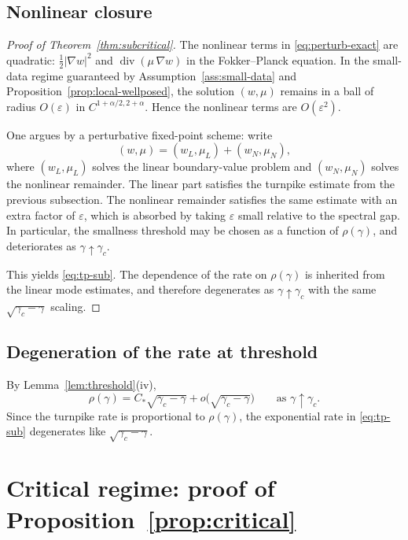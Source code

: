 \documentclass[11pt]{amsart}
\theoremstyle{definition}
\theoremstyle{remark}
\newcommand{\gamc}{\gamma_c}
\newcommand{\Div}{\operatorname{div}}
\newcommand{\grad}{\nabla}
\newcommand{\eps}{\varepsilon}
\begin{document}
\subsection{Nonlinear closure}
\label{sub:nonlinear}

\begin{proof}[Proof of Theorem~\ref{thm:subcritical}]
The nonlinear terms in \eqref{eq:perturb-exact} are quadratic:
$\frac12|\grad w|^2$ and $\Div(\mu\,\grad w)$ in the Fokker--Planck equation. In the small-data regime guaranteed by Assumption~\ref{ass:small-data} and Proposition~\ref{prop:local-wellposed}, the solution $(w,\mu)$ remains in a ball of radius $O(\eps)$ in $C^{1+\alpha/2,2+\alpha}$. Hence the nonlinear terms are $O(\eps^2)$.

One argues by a perturbative fixed-point scheme: write
\[
(w,\mu)=(w_L,\mu_L)+(w_N,\mu_N),
\]
where $(w_L,\mu_L)$ solves the linear boundary-value problem and $(w_N,\mu_N)$ solves the nonlinear remainder. The linear part satisfies the turnpike estimate from the previous subsection. The nonlinear remainder satisfies the same estimate with an extra factor of $\eps$, which is absorbed by taking $\eps$ small relative to the spectral gap. In particular, the smallness threshold may be chosen as a function of $\rho(\gamma)$, and deteriorates as $\gamma\uparrow\gamc$.

This yields \eqref{eq:tp-sub}. The dependence of the rate on $\rho(\gamma)$ is inherited from the linear mode estimates, and therefore degenerates as $\gamma\uparrow\gamc$ with the same $\sqrt{\gamc-\gamma}$ scaling.
\end{proof}

\subsection{Degeneration of the rate at threshold}
\label{sub:rate-degeneration}

By Lemma~\ref{lem:threshold}(iv),
\[
\rho(\gamma)=C_\ast\sqrt{\gamc-\gamma}+o\!\bigl(\sqrt{\gamc-\gamma}\bigr)
\qquad\text{as }\gamma\uparrow\gamc.
\]
Since the turnpike rate is proportional to $\rho(\gamma)$, the exponential rate in \eqref{eq:tp-sub} degenerates like $\sqrt{\gamc-\gamma}$.

\section{Critical regime: proof of Proposition~\ref{prop:critical}}
\label{sec:critical-proof}
\end{document}
